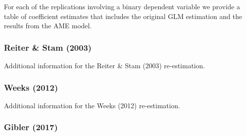 For each of the replications involving a binary dependent variable we provide a table of coefficient estimates that includes the original GLM estimation and the results from the AME model. 


\clearpage
\subsubsection*{Reiter \& Stam (2003)}

Additional information for the Reiter \& Stam (2003) re-estimation. 


\FloatBarrier

\FloatBarrier
\clearpage

\subsubsection*{Weeks (2012)}

Additional information for the Weeks (2012) re-estimation. 


\FloatBarrier

\FloatBarrier
\clearpage

\subsubsection*{Gibler (2017)}


